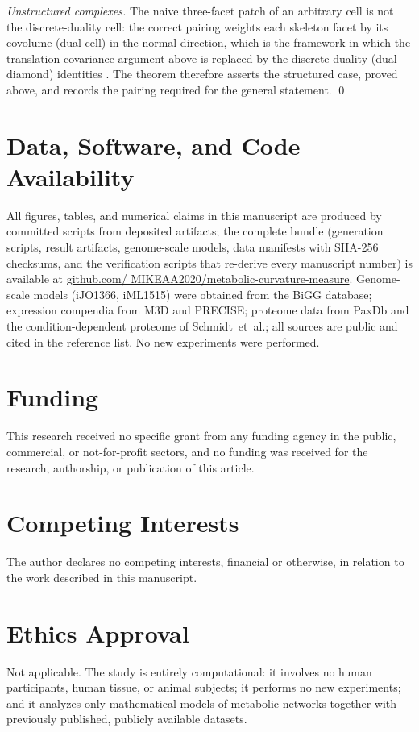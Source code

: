 \documentclass[11pt,a4paper]{article}
\theoremstyle{plain}
\theoremstyle{definition}
\theoremstyle{remark}
\begin{document}
\emph{Unstructured complexes.} The naive three-facet patch of an
arbitrary cell is not the discrete-duality cell: the correct pairing
weights each skeleton facet by its covolume (dual cell) in the
normal direction, which is the framework in which the
translation-covariance argument above is replaced by the
discrete-duality (dual-diamond) identities
\citep{cheeger1984}. The theorem therefore asserts the structured
case, proved above, and records the pairing required for the general
statement. \qed

\section*{Data, Software, and Code Availability}
All figures, tables, and numerical claims in this manuscript are
produced by committed scripts from deposited artifacts; the complete
bundle (generation scripts, result artifacts, genome-scale models,
data manifests with SHA-256 checksums, and the verification
scripts that re-derive every manuscript number) is available at
\href{https://github.com/MIKEAA2020/metabolic-curvature-measure}{github.com/
MIKEAA2020/metabolic-curvature-measure}. Genome-scale models
(iJO1366, iML1515) were obtained from the BiGG database; expression
compendia from M3D and PRECISE; proteome data from PaxDb and the
condition-dependent proteome of Schmidt~et~al.; all sources are
public and cited in the reference list. No new experiments were
performed.

\section*{Funding}
This research received no specific grant from any funding agency in
the public, commercial, or not-for-profit sectors, and no funding
was received for the research, authorship, or publication of this
article.

\section*{Competing Interests}
The author declares no competing interests, financial or otherwise,
in relation to the work described in this manuscript.

\section*{Ethics Approval}
Not applicable. The study is entirely computational: it involves no
human participants, human tissue, or animal subjects; it performs no
new experiments; and it analyzes only mathematical models of
metabolic networks together with previously published, publicly
available datasets.
\end{document}
